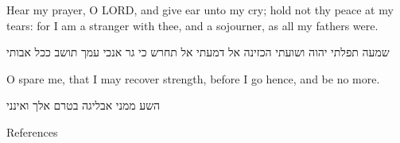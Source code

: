 \documentclass[dark]{gsf-presentation}
\newcommand{\LORD}{L{\fontsize{11}{11}\selectfont{}ORD}}
\begin{document}
\begin{frame}
	\LARGE
	\begin{english}
		\begin{center}
			Hear my prayer, O \LORD{}, and give ear unto
			my cry; hold not thy peace at my tears: for I
			am a stranger with thee, and a sojourner, as
			all my fathers were.
		\end{center}
	\end{english}

	\begin{hebrew}
		\begin{center}
			שמעה תפלתי יהוה ושועתי הכזינה אל דמעתי אל
			תחרש כי גר אנכי עמך תושב ככל אבותי
		\end{center}
	\end{hebrew}
\end{frame}

\begin{frame}
	\LARGE
	\begin{english}
		\begin{center}
			O spare me, that I may recover strength, before
			I go hence, and be no more.
		\end{center}
	\end{english}

	\begin{hebrew}
		\begin{center}
			השע ממני אבליגה בטרם אלך ואינני
		\end{center}
	\end{hebrew}
\end{frame}

\begin{frame}{References}
	\printbibliography
\end{frame}
\end{document}

